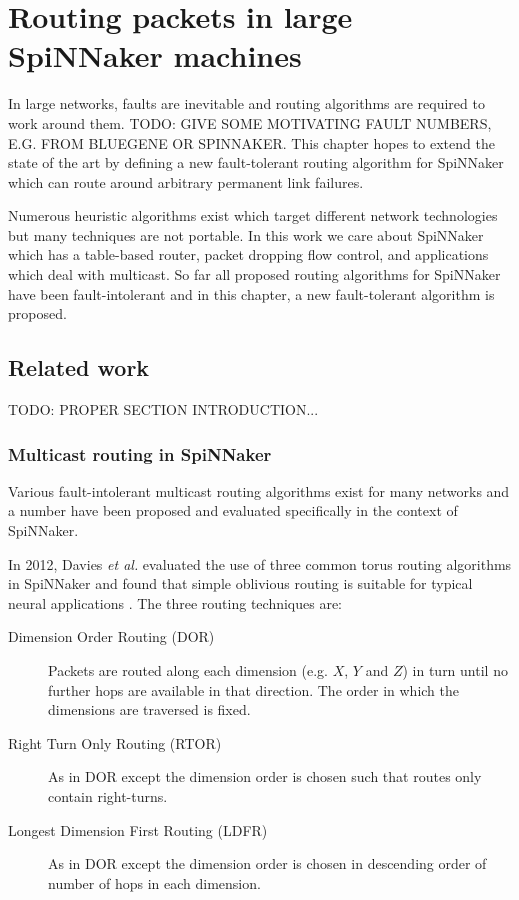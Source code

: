 \chapter{Routing packets in large SpiNNaker machines}
	
	In large networks, faults are inevitable and routing algorithms are required
	to work around them. TODO: GIVE SOME MOTIVATING FAULT NUMBERS, E.G. FROM
	BLUEGENE OR SPINNAKER. This chapter hopes to extend the state of the art by
	defining a new fault-tolerant routing algorithm for SpiNNaker which can route
	around arbitrary permanent link failures.
	
	Numerous heuristic algorithms exist which target different network
	technologies but many techniques are not portable. In this work we care
	about SpiNNaker which has a table-based router, packet dropping flow control,
	and applications which deal with multicast. So far all proposed routing
	algorithms for SpiNNaker have been fault-intolerant and in this chapter, a
	new fault-tolerant algorithm is proposed.
	
	\section{Related work}
		
		TODO: PROPER SECTION INTRODUCTION...
		
		\subsection{Multicast routing in SpiNNaker}
		
			Various fault-intolerant multicast routing algorithms exist for many
			networks and a number have been proposed and evaluated specifically in the
			context of SpiNNaker.
			
			In 2012, Davies \emph{et al.} evaluated the use of three common torus
			routing algorithms in SpiNNaker and found that simple oblivious routing is
			suitable for typical neural applications \cite{davies12}. The three
			routing techniques are:
			
			\begin{description}
				
				\item[Dimension Order Routing (DOR)] Packets are routed along each
				dimension (e.g. $X$, $Y$ and $Z$) in turn until no further hops are
				available in that direction.  The order in which the dimensions are
				traversed is fixed.
				
				\item[Right Turn Only Routing (RTOR)] As in DOR except the dimension
				order is chosen such that routes only contain right-turns.
				
				\item[Longest Dimension First Routing (LDFR)] As in DOR except the
				dimension order is chosen in descending order of number of hops in each
				dimension.
				
			\end{description}
			
